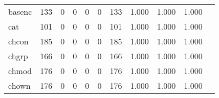 \begin{longtable}{lp{1.2cm}p{1.2cm}p{1.2cm}p{1.2cm}p{1.2cm}p{1.2cm}p{1.2cm}p{1.2cm}p{1.2cm}p{1.2cm}}
basenc    &                                   133 &                                                  0 &                                                  0 &                                                  0 &                                                  0 &                                                133 &                                              1.000 &                                              1.000 &                                              1.000 \\
cat       &                                   101 &                                                  0 &                                                  0 &                                                  0 &                                                  0 &                                                101 &                                              1.000 &                                              1.000 &                                              1.000 \\
chcon     &                                   185 &                                                  0 &                                                  0 &                                                  0 &                                                  0 &                                                185 &                                              1.000 &                                              1.000 &                                              1.000 \\
chgrp     &                                   166 &                                                  0 &                                                  0 &                                                  0 &                                                  0 &                                                166 &                                              1.000 &                                              1.000 &                                              1.000 \\
chmod     &                                   176 &                                                  0 &                                                  0 &                                                  0 &                                                  0 &                                                176 &                                              1.000 &                                              1.000 &                                              1.000 \\
chown     &                                   176 &                                                  0 &                                                  0 &                                                  0 &                                                  0 &                                                176 &                                              1.000 &                                              1.000 &                                              1.000 \\

\end{longtable}
